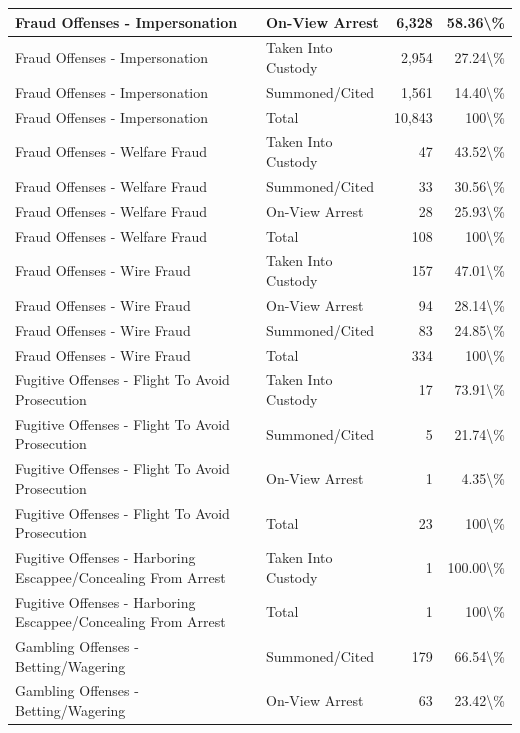 \documentclass[
]{krantz}
\begin{document}
\begin{longtable}[t]{l|l|r|r}
\hline
Fraud Offenses - Impersonation & On-View Arrest & 6,328 & 58.36\textbackslash{}\%\\
\hline
Fraud Offenses - Impersonation & Taken Into Custody & 2,954 & 27.24\textbackslash{}\%\\
\hline
Fraud Offenses - Impersonation & Summoned/Cited & 1,561 & 14.40\textbackslash{}\%\\
\hline
Fraud Offenses - Impersonation & Total & 10,843 & 100\textbackslash{}\%\\
\hline
Fraud Offenses - Welfare Fraud & Taken Into Custody & 47 & 43.52\textbackslash{}\%\\
\hline
Fraud Offenses - Welfare Fraud & Summoned/Cited & 33 & 30.56\textbackslash{}\%\\
\hline
Fraud Offenses - Welfare Fraud & On-View Arrest & 28 & 25.93\textbackslash{}\%\\
\hline
Fraud Offenses - Welfare Fraud & Total & 108 & 100\textbackslash{}\%\\
\hline
Fraud Offenses - Wire Fraud & Taken Into Custody & 157 & 47.01\textbackslash{}\%\\
\hline
Fraud Offenses - Wire Fraud & On-View Arrest & 94 & 28.14\textbackslash{}\%\\
\hline
Fraud Offenses - Wire Fraud & Summoned/Cited & 83 & 24.85\textbackslash{}\%\\
\hline
Fraud Offenses - Wire Fraud & Total & 334 & 100\textbackslash{}\%\\
\hline
Fugitive Offenses - Flight To Avoid Prosecution & Taken Into Custody & 17 & 73.91\textbackslash{}\%\\
\hline
Fugitive Offenses - Flight To Avoid Prosecution & Summoned/Cited & 5 & 21.74\textbackslash{}\%\\
\hline
Fugitive Offenses - Flight To Avoid Prosecution & On-View Arrest & 1 & 4.35\textbackslash{}\%\\
\hline
Fugitive Offenses - Flight To Avoid Prosecution & Total & 23 & 100\textbackslash{}\%\\
\hline
Fugitive Offenses - Harboring Escappee/Concealing From Arrest & Taken Into Custody & 1 & 100.00\textbackslash{}\%\\
\hline
Fugitive Offenses - Harboring Escappee/Concealing From Arrest & Total & 1 & 100\textbackslash{}\%\\
\hline
Gambling Offenses - Betting/Wagering & Summoned/Cited & 179 & 66.54\textbackslash{}\%\\
\hline
Gambling Offenses - Betting/Wagering & On-View Arrest & 63 & 23.42\textbackslash{}\%\\

\end{longtable}
\end{document}
